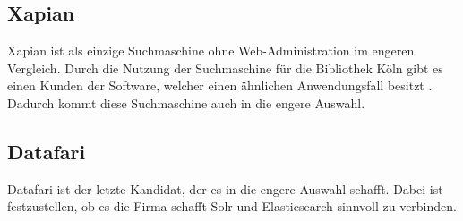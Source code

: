 \subsection{Xapian} 

Xapian ist als einzige Suchmaschine ohne Web-Administration im engeren Vergleich. Durch die Nutzung der Suchmaschine für die Bibliothek Köln gibt es einen Kunden der Software, welcher einen ähnlichen Anwendungsfall besitzt \cite{Xapian.2019}. Dadurch kommt diese Suchmaschine auch in die engere Auswahl. \cite{XAP.2019}

\subsection{Datafari}

Datafari ist der letzte Kandidat, der es in die engere Auswahl schafft. Dabei ist festzustellen, ob es die Firma schafft Solr und Elasticsearch sinnvoll zu verbinden.\cite{Labs.b}